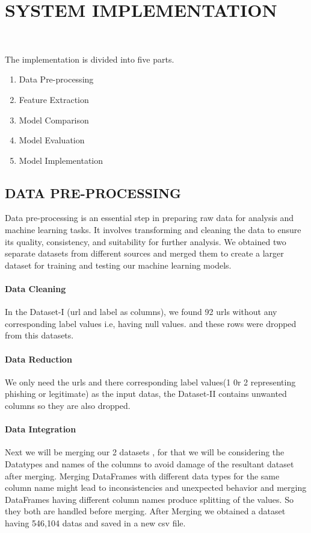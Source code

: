 
\chapter{SYSTEM IMPLEMENTATION }
\thispagestyle{empty}
\\

\par The implementation is divided into five parts.
\begin{enumerate}
    \item Data Pre-processing
    \item Feature Extraction
    \item Model Comparison
    \item Model Evaluation
    \item Model Implementation
\end{enumerate}

\section{DATA PRE-PROCESSING}
\par Data pre-processing is an essential step in preparing raw data for analysis and machine learning tasks. It involves transforming and cleaning the data to ensure its quality, consistency, and suitability for further analysis.
We obtained two separate datasets from different sources and merged them to create a larger dataset for training and testing our machine learning models.
\subsubsection{Data Cleaning}
\par In the Dataset-I (url and label as columns), we found 92 urls without any corresponding label values i.e, having null values. and these rows were dropped from this datasets.
\subsubsection{Data Reduction}
We only need the urls and there corresponding label values(1 0r 2 representing phishing or legitimate) as the input datas, the Dataset-II contains unwanted columns so they are also dropped.
\subsubsection{Data Integration}
Next we will be merging our 2 datasets , for that we will be considering the Datatypes and names of the columns to avoid damage of the resultant dataset after merging. Merging DataFrames with different data types for the same column name might lead to inconsistencies and unexpected behavior and merging DataFrames having different column names produce splitting of the values. So they both are handled before merging. After Merging we obtained a dataset having 546,104 datas and saved in a new csv file.

